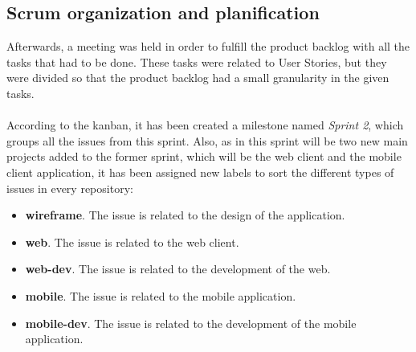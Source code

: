 \documentclass[./main.tex]{subfiles}
\begin{document}
\subsection{Scrum organization and planification}
Afterwards, a meeting was held in order to fulfill the product backlog
with all the tasks that had to be done. These tasks were related to User
Stories, but they were divided so that the product backlog had a small
granularity in the given tasks.
\\
\\
According to the kanban, it has been created a milestone named \textit{Sprint 2}, which groups all the issues from this sprint. Also, as in this sprint will be two new main projects added to the former sprint, which will be the web client and the mobile client application, it has been assigned new labels to sort the different types of issues in every repository:
\begin{itemize}
	\item \textbf{wireframe}. The issue is related to the design of the application.
	\item \textbf{web}. The issue is related to the web client.
	\item \textbf{web-dev}. The issue is related to the development of the web.
	\item \textbf{mobile}. The issue is related to the mobile application.
	\item \textbf{mobile-dev}. The issue is related to the development of the mobile application.
\end{itemize}
\end{document}
